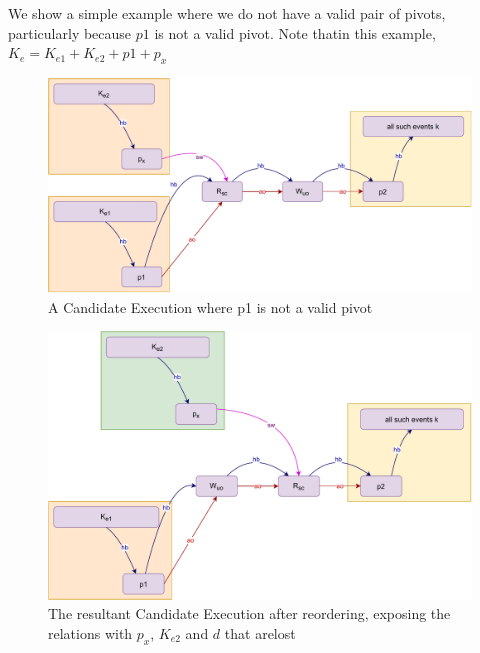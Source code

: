     We show a simple example where we do not have a valid pair of pivots, particularly because $p1$ is not a valid pivot. Note thatin this example, $K_e = K_{e1} + K_{e2} + p1 + p_x$
    \begin{figure}[H]
        \centering
        \includegraphics[scale=0.7]{InstructionReordering/ValidReorderingProof/ProofParts/Part1/part1(e).pdf}
        \caption{A Candidate Execution where p1 is not a valid pivot}
        \label{fig:my_label}
    \end{figure}
    
    \begin{figure}[H]
        \centering
        \includegraphics[scale=0.7]{InstructionReordering/ValidReorderingProof/ProofParts/Part1/part1(f).pdf}
        \caption{The resultant Candidate Execution after reordering, exposing the relations with $p_x$, $K_{e2}$ and $d$ that arelost}
        \label{fig:my_label}
    \end{figure}
        
